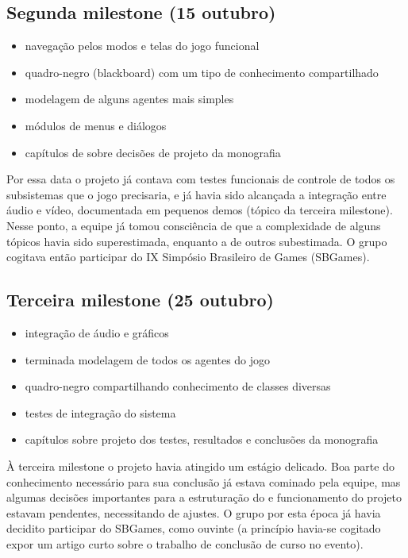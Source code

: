 \subsection{Segunda milestone (15 outubro)}
\begin{itemize}
\item navegação pelos modos e telas do jogo funcional
\item quadro-negro (blackboard) com um tipo de conhecimento compartilhado
\item modelagem de alguns agentes mais simples
\item módulos de menus e diálogos
\item capítulos de sobre decisões de projeto da monografia
\end{itemize}

Por essa data o projeto já contava com testes funcionais de controle de todos os subsistemas que o jogo precisaria, e já havia sido alcançada a integração entre áudio e vídeo, documentada em pequenos demos (tópico da terceira milestone). Nesse ponto, a equipe já tomou consciência de que a complexidade de alguns tópicos havia sido superestimada, enquanto a de outros subestimada. O grupo cogitava então participar do IX Simpósio Brasileiro de Games (SBGames).

\subsection{Terceira milestone (25 outubro)}
\begin{itemize}
\item integração de áudio e gráficos
\item terminada modelagem de todos os agentes do jogo
\item quadro-negro compartilhando conhecimento de classes diversas
\item testes de integração do sistema
\item capítulos sobre projeto dos testes, resultados e conclusões da monografia
\end{itemize}

À terceira milestone o projeto havia atingido um estágio delicado. Boa parte do conhecimento necessário para sua conclusão já estava cominado pela equipe, mas algumas decisões importantes para a estruturação do e funcionamento do projeto estavam pendentes, necessitando de ajustes. O grupo por esta época já havia decidito participar do SBGames, como ouvinte (a princípio havia-se cogitado expor um artigo curto sobre o trabalho de conclusão de curso no evento).   

